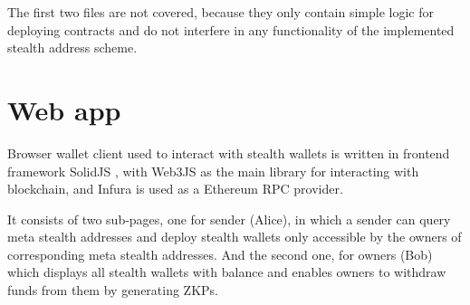 \begin{table}[ht]
\centering
{}
\caption{Solidity code coverage}
\label{table:coverage}
\end{table}

The first two files are not covered, because they only contain simple logic
for deploying contracts and do not interfere in any functionality of the
implemented stealth address scheme.

\section{Web app}

Browser wallet client used to interact with stealth wallets is written in
frontend framework SolidJS \cite{solidjs}, with Web3JS \cite{web3js}
as the main library for interacting with blockchain, and Infura \cite{infura}
is used as a Ethereum RPC provider.

It consists of two sub-pages, one for sender (Alice), in which a sender
can query meta stealth addresses and deploy stealth wallets only accessible
by the owners of corresponding meta stealth addresses. And the second one,
for owners (Bob) which displays all stealth wallets with balance and enables
owners to withdraw funds from them by generating ZKPs.

